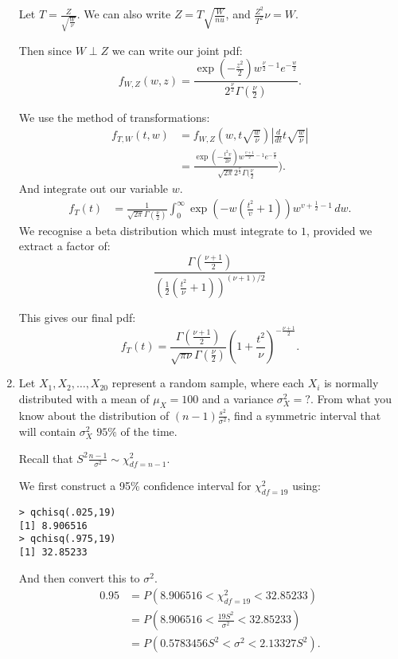 \documentclass{article}
\begin{document}
\begin{enumerate}
Let $T=\frac{Z}{\sqrt{\frac{W}{\nu}} }$. We can also write $Z=T\sqrt{\frac{W}{nu}} $, and $\frac{Z^2}{T^2}\nu=W$.

Then since $W\perp Z$ we can write our joint pdf:
\[
f_{W,Z}(w,z)= \frac{\exp\left(-\frac{z^2}{2}\right) w^{\frac{\nu}{2}-1}e^{-\frac{w}{2}}}{2^{\frac{\nu}{2}}\Gamma\left( \frac{\nu}{2} \right) }
.\] 


We use the method of transformations:
\begin{align*}
    f_{T,W}(t,w)&= f_{W,Z}(w,t\sqrt{\frac{w}{\nu}} )\left| \frac{d}{dt}t\sqrt{\frac{w}{\nu}}\right|  \\
    &=\frac{\exp(-\frac{t^2v}{2\nu})w^{\frac{v+1}{2}-1}e^{-\frac{w}{2}}}{\sqrt{2\pi} 2^{\frac{v}{2}}\Gamma(\frac{\nu}{2}}) 
.\end{align*}
And integrate out our variable $w$.
\begin{align*}
    f_T(t)&=\frac{1}{\sqrt{2\pi} \Gamma(\frac{\nu}{2})}\int_{0}^{\infty} \exp\left( -w\left(\frac{t^2}{v}+1\right) \right)w^{v+\frac{1}{2}-1}\, d w 
.\end{align*}
We recognise a beta distribution which must integrate to $1$, provided we extract a factor of:
$$\frac{\Gamma\left(\frac{\nu+1}2\right)}{\left(\frac12\left(\frac{t^2}\nu+1\right)\right)^{(\nu+1)/2}}$$

This gives our final pdf:
\[
 f_T(t)=\frac{\Gamma\left(\frac{\nu+1}{2}\right)}{\sqrt{\pi\nu}\Gamma\left(\frac{\nu}{2}\right)}\left(1+\frac{t^2}{\nu}\right)^{-\frac{\nu+1}{2}}
.\]
\item Let $X_1, X_2, \ldots, X_{20}$ represent a random sample, where each $X_i$ is normally distributed with a mean of
$\mu_X = 100$ and a variance $\sigma^2_X =?$. From what you know about the distribution of $(n-1)\frac{s^2}{\sigma^2}$, find a symmetric
interval that will contain $\sigma^2_X$ 
$95\%$ of the time. 

Recall that $S^2\frac{n-1}{\sigma^2}\sim\chi^2_{df=n-1}$.

We first construct a 95\% confidence interval for $\chi^2_{df=19}$ using:
\begin{verbatim}
> qchisq(.025,19)
[1] 8.906516
> qchisq(.975,19)
[1] 32.85233
\end{verbatim}
And then convert this to $\sigma^2$.
    \begin{align*}
        0.95&=P(8.906516<\chi^2_{df=19}< 32.85233)  \\
        &=P(8.906516<\frac{19S^2}{\sigma^2}< 32.85233)  \\
        &=P\left( 0.5783456S^2<\sigma^2<2.13327S^2  \right)
    .\end{align*}


\end{enumerate}
\end{document}
